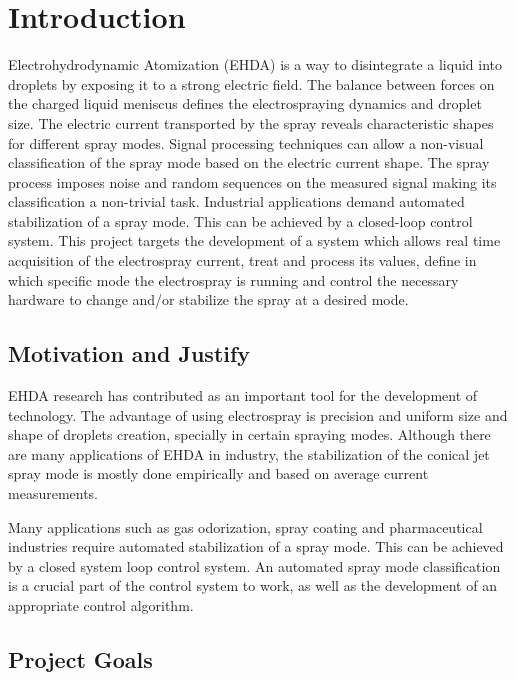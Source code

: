 \chapter{Introduction}
\label{chap:intro} 

Electrohydrodynamic Atomization (EHDA) is a way to disintegrate a liquid into droplets by exposing it to a strong electric field.\cite{prunet}
The balance between forces on the charged liquid meniscus defines the electrospraying dynamics and droplet size.
The electric current transported by the spray reveals characteristic shapes for different spray modes.
Signal processing techniques can allow a non-visual classification of the spray mode based on the electric current shape.\cite{Sjaaks}
The spray process imposes noise and random sequences on the measured signal making its classification a non-trivial task. 
Industrial applications demand automated stabilization of a spray mode. 
This can be achieved by a closed-loop control system. 
This project targets the development of a system which allows real time acquisition of the electrospray current, treat and process its values, define in which specific mode the electrospray is running and control the necessary hardware to change and/or stabilize the spray at a desired mode.


\section{Motivation and Justify}
\label{sec:motivation}

EHDA research has contributed as an important tool for the development of technology. 
The advantage of using electrospray is precision and uniform size and shape of droplets creation, specially in certain spraying modes. 
Although there are many applications of EHDA in industry, the stabilization of the conical jet spray mode is mostly done empirically and based on average current measurements.

Many applications such as gas odorization, spray coating and pharmaceutical industries require automated stabilization of a spray mode. 
This can be achieved by a closed system loop control system. 
An automated spray mode classification is a crucial part of the control system to work, as well as the development of an appropriate control algorithm.

\section{Project Goals}
\label{sec:goals}

